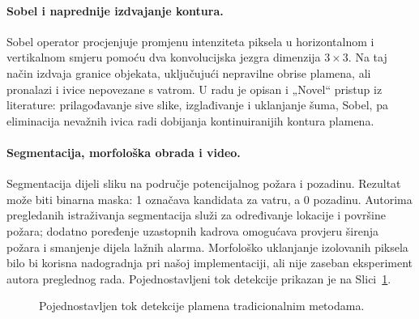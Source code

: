 \paragraph{Sobel i naprednije izdvajanje kontura.} Sobel operator procjenjuje promjenu intenziteta piksela u horizontalnom i vertikalnom smjeru pomoću dva konvolucijska jezgra dimenzija $3\times 3$. Na taj način izdvaja granice objekata, uključujući nepravilne obrise plamena, ali pronalazi i ivice nepovezane s vatrom. U radu je opisan i „Novel“ pristup iz literature: prilagođavanje sive slike, izglađivanje i uklanjanje šuma, Sobel, pa eliminacija nevažnih ivica radi dobijanja kontinuiranijih kontura plamena.

\paragraph{Segmentacija, morfološka obrada i video.} Segmentacija dijeli sliku na područje potencijalnog požara i pozadinu. Rezultat može biti binarna maska: 1 označava kandidata za vatru, a 0 pozadinu. Autorima pregledanih istraživanja segmentacija služi za određivanje lokacije i površine požara; dodatno poređenje uzastopnih kadrova omogućava provjeru širenja požara i smanjenje dijela lažnih alarma. Morfološko uklanjanje izolovanih piksela bilo bi korisna nadogradnja pri našoj implementaciji, ali nije zaseban eksperiment autora preglednog rada. Pojednostavljeni tok detekcije prikazan je na Slici~\ref{fig:tok-tradicionalni}.

\begin{figure}[H]
\centering
{}
\caption{Pojednostavljen tok detekcije plamena tradicionalnim metodama.}
\label{fig:tok-tradicionalni}
\end{figure}

